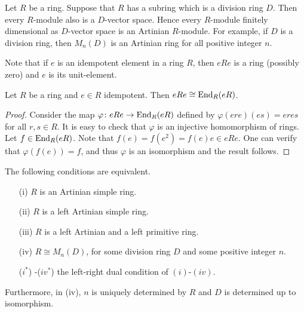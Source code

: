 \begin{example}
Let $R$ be a ring. Suppose that $R$ has a subring which is a division ring $D$. Then every $R$-module also is a $D$-vector space. Hence every $R$-module finitely dimensional as $D$-vector space
is an Artinian $R$-module.
For example, if $D$ is a division ring, then $M_n(D)$ is an Artinian ring for all positive integer $n$.
\end{example}


Note that if $e$ is an idempotent element in a ring $R$, then
$eRe$ is a ring (possibly zero) and $e$ is its unit-element.

\begin{lemma}\label{Lema 1.4.2}
Let $R$ be a ring and $e\in R$ idempotent. Then $eRe\cong
\operatorname{End}_R(eR)$.
\end{lemma}

\begin{proof}
Consider the map $\varphi\colon eRe\rightarrow \operatorname{End}_R(eR)$ defined by  $\varphi
(ere)(es)=eres$ for all $r,s\in R$. It is easy to check that $\varphi$ is an injective homomorphism of rings.
Let $f\in \operatorname{End}_R(eR)$. Note that $f(e)=f(e^2)=f(e)e\in
eRe$. One can verify that $\varphi (f(e))=f$, and thus $\varphi$
is an isomorphism and the result follows.
\end{proof}

\begin{theorem}
\label{Teorema 1.4.3}
The following conditions are equivalent.
\begin{itemize}\item[(i)] $R$ is an Artinian simple ring.
\item[(ii)] $R$ is a left Artinian simple ring.
\item[(iii)] $R$ is a left Artinian and a left primitive ring.
\item[(iv)] $R\cong M_n(D)$, for some division ring $D$ and some positive integer $n$.
\item[($i^*$)]-($iv^*$) the left-right dual condition of $(i)$-$(iv)$.
\end{itemize}
Furthermore, in (iv),  $n$ is uniquely determined by $R$ and $D$ is determined up to isomorphism.
\end{theorem}

